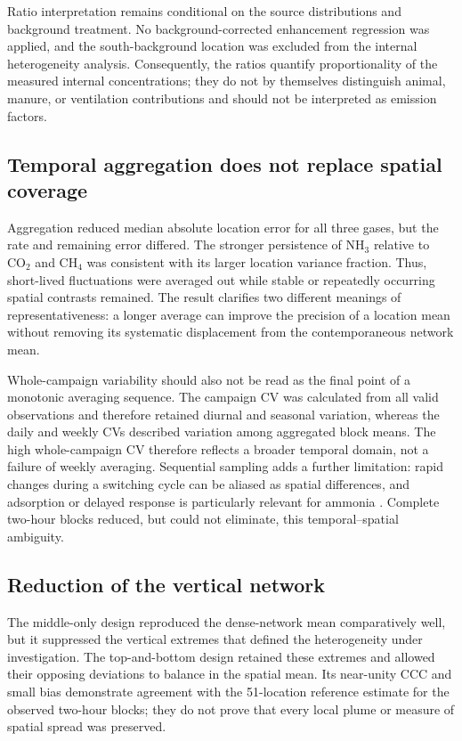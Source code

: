 \documentclass[12pt,a4paper]{article}
\begin{document}
Ratio interpretation remains conditional on the source distributions and
background treatment. No background-corrected enhancement regression was
applied, and the south-background location was excluded from the internal
heterogeneity analysis. Consequently, the ratios quantify proportionality of
the measured internal concentrations; they do not by themselves distinguish
animal, manure, or ventilation contributions and should not be interpreted as
emission factors.

\subsection{Temporal aggregation does not replace spatial coverage}

Aggregation reduced median absolute location error for all three gases, but
the rate and remaining error differed. The stronger persistence of
\(\mathrm{NH_3}\) relative to \(\mathrm{CO_2}\) and
\(\mathrm{CH_4}\) was consistent with its larger location variance fraction.
Thus, short-lived fluctuations were averaged out while stable or repeatedly
occurring spatial contrasts remained. The result clarifies two different
meanings of representativeness: a longer average can improve the precision of
a location mean without removing its systematic displacement from the
contemporaneous network mean.

Whole-campaign variability should also not be read as the final point of a
monotonic averaging sequence. The campaign CV was calculated from all valid
observations and therefore retained diurnal and seasonal variation, whereas
the daily and weekly CVs described variation among aggregated block means.
The high whole-campaign CV therefore reflects a broader temporal domain, not a
failure of weekly averaging. Sequential sampling adds a further limitation:
rapid changes during a switching cycle can be aliased as spatial differences,
and adsorption or delayed response is particularly relevant for ammonia
\citep{Rom2010}. Complete two-hour blocks reduced, but could not eliminate,
this temporal--spatial ambiguity.

\subsection{Reduction of the vertical network}

The middle-only design reproduced the dense-network mean comparatively well,
but it suppressed the vertical extremes that defined the heterogeneity under
investigation. The top-and-bottom design retained these extremes and allowed
their opposing deviations to balance in the spatial mean. Its near-unity CCC
and small bias demonstrate agreement with the 51-location reference estimate
for the observed two-hour blocks; they do not prove that every local plume or
measure of spatial spread was preserved.
\end{document}
